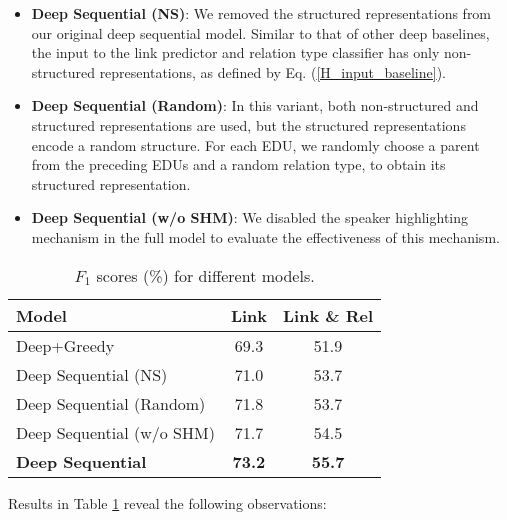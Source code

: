\documentclass[letterpaper]{article} \usepackage{aaai19}  \usepackage{times}  \usepackage{helvet}  \usepackage{courier}  \usepackage{url}  \usepackage{graphicx}  \usepackage{amssymb}
\begin{document}
\begin{itemize}
    \item \textbf{Deep Sequential (NS)}:
    We removed the structured representations from our original deep sequential model.
    Similar to that of other deep baselines, the input to the link predictor and relation type classifier has only non-structured representations, as defined by Eq. (\ref{H_input_baseline}).
    
    \item \textbf{Deep Sequential (Random)}:
    In this variant, both non-structured and structured representations are used, but the structured representations encode a random structure. For each EDU, we randomly choose a parent from the preceding EDUs and a random relation type, to obtain its structured representation.
    
    \item \textbf{Deep Sequential (w/o SHM)}:
    We disabled the speaker highlighting mechanism in the full model to evaluate the effectiveness of this mechanism.
\end{itemize}

\begin{table}[ht]
  \centering
  \begin{tabular}{l|c|c}
    \hline
    Model & Link & Link \& Rel \\
    \hline
    Deep+Greedy & 69.3 & 51.9 \\
    \hline
    Deep Sequential (NS) & 71.0 & 53.7 \\
    Deep Sequential (Random) & 71.8 & 53.7 \\
    Deep Sequential (w/o SHM) & 71.7 & 54.5 \\
    \hline
    \textbf{Deep Sequential} & \textbf{73.2} & \textbf{55.7} \\
    \hline
  \end{tabular}
  \caption{$F_1$ scores (\%) for different models. }
  \label{results_variants}
\end{table}

Results in Table \ref{results_variants} reveal the following observations:
\end{document}
